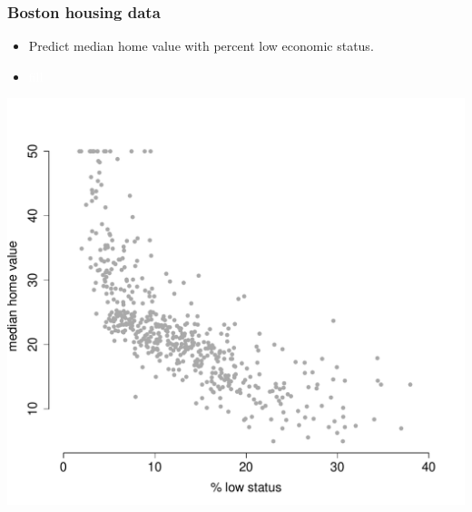 \documentclass{beamer}
\newcommand{\bo}[1]{\textcolor{burntorange}{#1}}
\begin{document}
\begin{frame}[plain]
\frametitle{Boston housing data}
\vspace{5mm}
\begin{itemize}
\item[] Predict \bo{median home value} with \bo{percent low economic status}.
\item[] \textcolor{white}{fill}
\end{itemize}
\vspace{-16mm}
\begin{center}
\includegraphics[scale=.39]{DaveBostonplot.pdf}
\end{center}

\end{frame}
\end{document}
